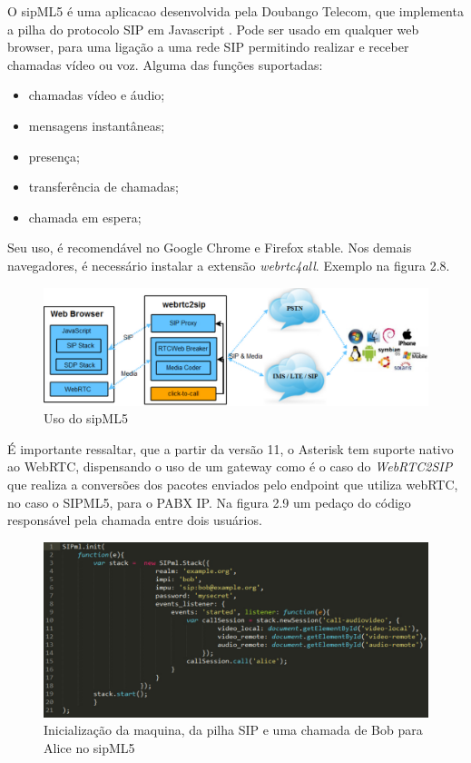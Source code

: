 \documentclass[ruledheader]{abnt} %
\begin{document}
O sipML5 é uma aplicacao desenvolvida pela Doubango Telecom, que implementa a pilha do protocolo SIP em Javascript \cite{Borges:2013}. Pode ser usado em qualquer web browser, para uma ligação a uma rede SIP permitindo realizar e receber chamadas vídeo ou voz. Alguma das funções suportadas:

\begin{itemize} %
 \item chamadas vídeo e áudio;
 \item mensagens instantâneas;
 \item presença;
 \item transferência de chamadas;
 \item chamada em espera;
\end{itemize}

Seu uso, é recomendável no Google Chrome e Firefox stable. Nos demais navegadores, é necessário instalar a extensão \textit{webrtc4all}. Exemplo na figura 2.8.

\begin{figure}[!htdb]
 \centering
  \includegraphics[width = 1\linewidth]{images/sipml5}
  \caption{Uso do sipML5} %
  \label{f_mediaStream}
\end{figure}

É importante ressaltar, que a partir da versão 11, o Asterisk tem suporte nativo ao WebRTC, dispensando o uso de um gateway como é o caso do \textit{WebRTC2SIP} que realiza a conversões dos pacotes enviados pelo endpoint que utiliza webRTC, no caso o SIPML5, para o PABX IP. Na figura 2.9 um pedaço do código responsável pela chamada entre dois usuários.


\begin{figure}[!htdb]
 \centering
  \includegraphics[width = 1\linewidth]{images/sipml5code}
  \caption{Inicialização da maquina, da pilha SIP e uma chamada de Bob para Alice no sipML5} %
  \label{f_mediaStream}
\end{figure}
\end{document}

